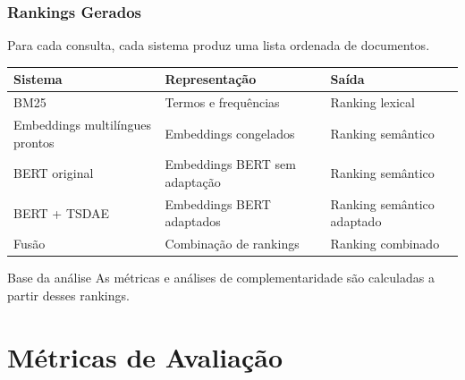 \documentclass[aspectratio=169]{beamer}
\begin{document}
\begin{frame}
\frametitle{Rankings Gerados}

Para cada consulta, cada sistema produz uma lista ordenada de documentos.

\vspace{0.25cm}

\begin{table}
\centering
\small
\begin{tabular}{@{}lll@{}}
\toprule
\textbf{Sistema} & \textbf{Representação} & \textbf{Saída} \\
\midrule
BM25 & Termos e frequências & Ranking lexical \\
Embeddings multilíngues prontos & Embeddings congelados & Ranking semântico \\
BERT original & Embeddings BERT sem adaptação & Ranking semântico \\
BERT + TSDAE & Embeddings BERT adaptados & Ranking semântico adaptado \\
Fusão & Combinação de rankings & Ranking combinado \\
\bottomrule
\end{tabular}
\end{table}

\vspace{0.25cm}

\begin{block}{Base da análise}
As métricas e análises de complementaridade são calculadas a partir desses rankings.
\end{block}

\end{frame}

\section{Métricas de Avaliação}
\end{document}
